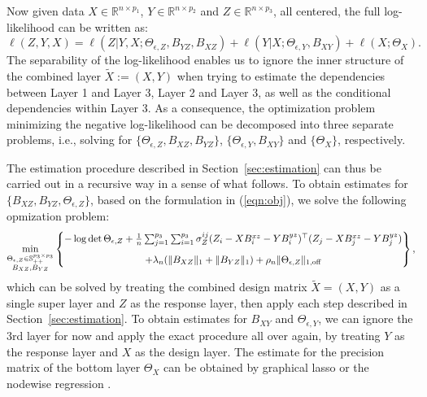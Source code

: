 Now given data $X\in\mathbb{R}^{n\times p_1}$, $Y\in\mathbb{R}^{n\times p_2}$ and $Z\in\mathbb{R}^{n \times p_3}$, all centered, the full log-likelihood can be written as:
\begin{equation}
\ell(Z,Y,X) = \ell(Z|Y,X; \Theta_{\epsilon,Z},B_{YZ},B_{XZ}) + \ell(Y|X;\Theta_{\epsilon,Y},B_{XY}) + \ell(X;\Theta_X).
\end{equation}
The separability of the log-likelihood enables us to ignore the inner structure of the combined layer $\widetilde{X}:=(X,Y)$ when trying to estimate the dependencies between Layer 1 and Layer 3, Layer 2 and Layer 3, as well as the conditional dependencies within Layer 3. As a consequence, the optimization problem minimizing the negative log-likelihood can be decomposed into three separate problems, i.e., solving for $\{\Theta_{\epsilon,Z},B_{XZ},B_{YZ}\}$, $\{\Theta_{\epsilon,Y},B_{XY}\}$ and $\{\Theta_X\}$, respectively. 

The estimation procedure described in Section~\ref{sec:estimation} can thus be carried out in a recursive way in a sense of what follows. To obtain estimates for $\{B_{XZ},B_{YZ},\Theta_{\epsilon,Z}\}$, based on the formulation in (\ref{eqn:obj}), we solve the following opmization problem:
\begin{eqnarray*}
\min\limits_{\substack{\Theta_{\epsilon,Z}\in\mathbb{S}_{++}^{p_3\times p_3}\\B_{XZ},B_{YZ}}}  \begin{Bmatrix} -\log\det\Theta_{\epsilon,Z} + \frac{1}{n}\sum_{j=1}^{p_3}\sum_{i=1}^{p_3} \sigma_Z^{ij}(Z_i-XB^{xz}_i-YB^{yz}_i)^\top(Z_j-XB^{xz}_j-YB^{yz}_j)  \vspace*{3mm}\\
+\lambda_n(\|B_{XZ}\|_1 + \|B_{YZ}\|_1)+ \rho_n\|\Theta_{\epsilon,Z}\|_{1,\text{off}}  \end{Bmatrix},
\end{eqnarray*}
which can be solved by treating the combined design matrix $\widetilde{X}=(X,Y)$ as a single super layer and $Z$ as the response layer, then apply each step described in Section~\ref{sec:estimation}. To obtain estimates for $B_{XY}$ and $\Theta_{\epsilon,Y}$, we can ignore the 3rd layer for now and apply the exact procedure all over again, by treating $Y$ as the response layer and $X$ as the design layer. The estimate for the precision matrix of the bottom layer $\Theta_X$ can be obtained by graphical lasso \citep{friedman2008sparse} or the nodewise regression \citep{meinshausen2006high}. \\